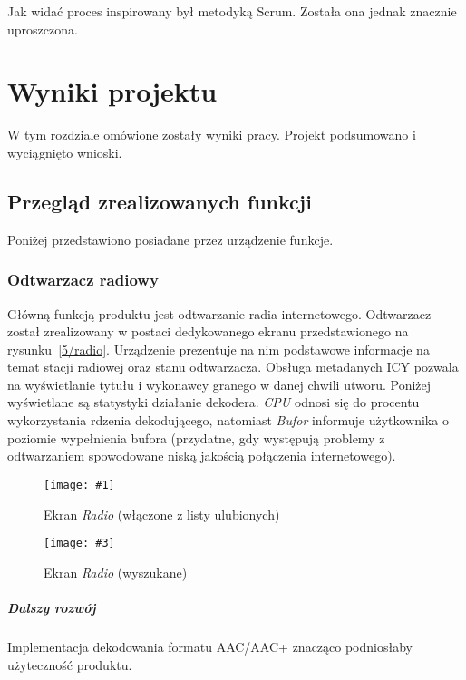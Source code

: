 \documentclass[polish]{aghengthesis}
\newcommand{\imgintss}[5]{
	\begin{figure}[{#5}]
		\centering
		\begin{minipage}{.45\textwidth}
			\centering
			\texttt{[image: \#1]}
			\caption{#2}
			\label{#1}
		\end{minipage}%
		\hfill
		\begin{minipage}{.45\textwidth}
			\centering
			\texttt{[image: \#3]}
			\caption{#4}
			\label{#3}
		\end{minipage}
	\end{figure}
}
\newcommand{\imghss}[4]{\imgintss{#1}{#2}{#3}{#4}{H}}
\begin{document}
		 Jak widać proces inspirowany był metodyką Scrum. Została ona jednak znacznie uproszczona.
	 	
\chapter{Wyniki projektu}
	W tym rozdziale omówione zostały wyniki pracy.
	Projekt podsumowano i wyciągnięto wnioski.
	
	\section{Przegląd zrealizowanych funkcji}
		Poniżej przedstawiono posiadane przez urządzenie funkcje.
	
		\subsection{Odtwarzacz radiowy}			
			Główną funkcją produktu jest odtwarzanie radia internetowego. Odtwarzacz został zrealizowany w postaci dedykowanego ekranu przedstawionego na rysunku~\ref{5/radio}. Urządzenie prezentuje na nim podstawowe informacje na temat stacji radiowej oraz stanu odtwarzacza. Obsługa metadanych ICY pozwala na wyświetlanie tytułu i wykonawcy granego w danej chwili utworu. Poniżej wyświetlane są statystyki działanie dekodera. \textit{CPU} odnosi się do procentu wykorzystania rdzenia dekodującego, natomiast \textit{Bufor} informuje użytkownika o poziomie wypełnienia bufora (przydatne, gdy występują problemy z odtwarzaniem spowodowane niską jakością połączenia internetowego).
			
			\imghss{5/radio}{Ekran \textit{Radio} (włączone z listy ulubionych)}{5/radio_search}{Ekran \textit{Radio} (wyszukane)}
			
		
			\paragraph{Dalszy rozwój}
				Implementacja dekodowania formatu AAC/AAC+ znacząco podniosłaby użyteczność produktu.
			
\end{document}
